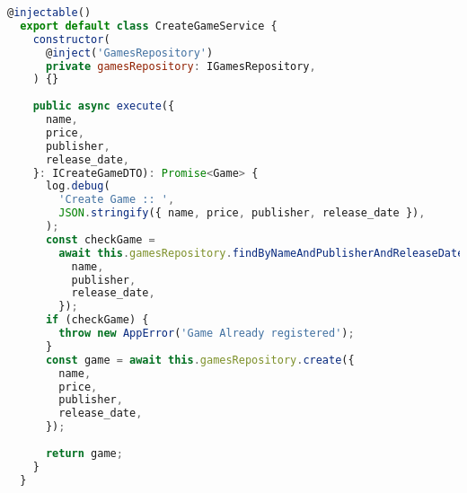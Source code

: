 \begin{lstlisting}[language=JavaScript, caption={CreateGameService.ts},captionpos=b, label=alg:creategameservice]
  @injectable()
  export default class CreateGameService {
    constructor(
      @inject('GamesRepository')
      private gamesRepository: IGamesRepository,
    ) {}
  
    public async execute({
      name,
      price,
      publisher,
      release_date,
    }: ICreateGameDTO): Promise<Game> {
      log.debug(
        'Create Game :: ',
        JSON.stringify({ name, price, publisher, release_date }),
      );
      const checkGame =
        await this.gamesRepository.findByNameAndPublisherAndReleaseDate({
          name,
          publisher,
          release_date,
        });
      if (checkGame) {
        throw new AppError('Game Already registered');
      }
      const game = await this.gamesRepository.create({
        name,
        price,
        publisher,
        release_date,
      });
  
      return game;
    }
  }
\end{lstlisting}
  
